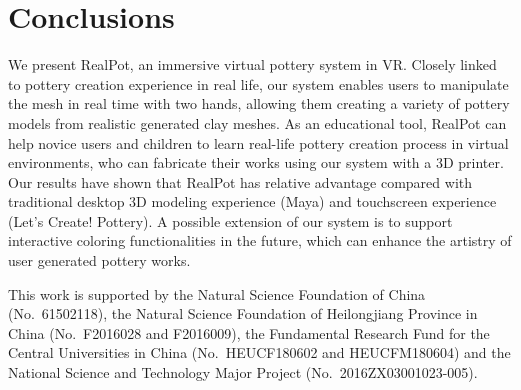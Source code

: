 \documentclass{svjour3}                     %
\begin{document}
\section{Conclusions}
\label{sec:8}

We present RealPot, an immersive virtual pottery system in VR.
Closely linked to pottery creation experience in real life, our system enables users to manipulate the mesh in real time with two hands, allowing them creating a variety of pottery models from realistic generated clay meshes.
As an educational tool, RealPot can help novice users and children to learn real-life pottery creation process in virtual environments, who can fabricate their works using our system with a 3D printer.
Our results have shown that RealPot has relative advantage compared with traditional desktop 3D modeling experience (Maya) and touchscreen experience (Let's Create! Pottery).
A possible extension of our system is to support interactive coloring functionalities in the future, which can enhance the artistry of user generated pottery works.


\begin{acknowledgements}
This work is supported by the Natural Science Foundation of China (No.~61502118), the Natural Science Foundation of Heilongjiang Province in China (No.~F2016028 and F2016009), the Fundamental Research Fund for the Central Universities in China (No.~HEUCF180602 and HEUCFM180604) and the National Science and Technology Major Project (No.~2016ZX03001023-005).
\end{acknowledgements}


%
%
\end{document}
